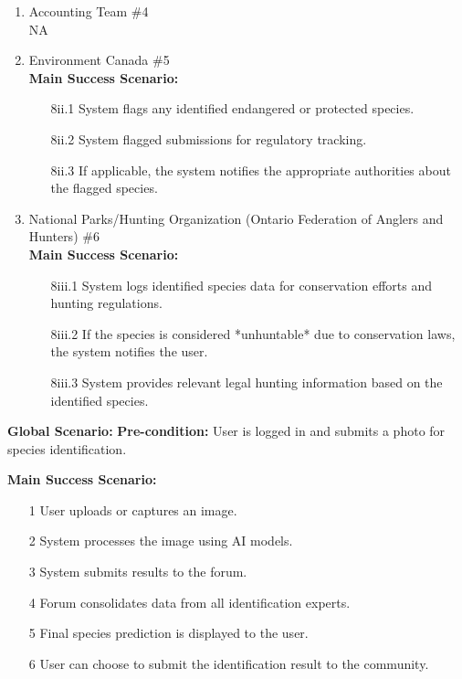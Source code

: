 \documentclass[]{article}
\begin{document}
\begin{enumerate}[{\bf BE1.}]
\begin{enumerate}[{\bf VP1.}]
    \item Accounting Team \#4 \\
        \newline NA

    \item Environment Canada \#5 \\
        \newline \textbf{Main Success Scenario:}
        \begin{enumerate}
            \item[8ii.1] System flags any identified endangered or protected species.
            \item[8ii.2] System flagged submissions for regulatory tracking.
            \item[8ii.3] If applicable, the system notifies the appropriate authorities about the flagged species.
        \end{enumerate}

    \item National Parks/Hunting Organization (Ontario Federation of Anglers and Hunters) \#6 \\
        \newline \textbf{Main Success Scenario:}
        \begin{enumerate}
            \item[8iii.1] System logs identified species data for conservation efforts and hunting regulations.
            \item[8iii.2] If the species is considered *unhuntable* due to conservation laws, the system notifies the user.
            \item[8iii.3] System provides relevant legal hunting information based on the identified species.
        \end{enumerate}
    \end{enumerate}
\textbf{Global Scenario:}
\noindent \textbf{Pre-condition:}  
    User is logged in and submits a photo for species identification.

\noindent \textbf{Main Success Scenario:}
\begin{enumerate}
    \item[1] User uploads or captures an image.
    \item[2] System processes the image using AI models.
    \item[3] System submits results to the forum.
    \item[4] Forum consolidates data from all identification experts.
    \item[5] Final species prediction is displayed to the user.
    \item[6] User can choose to submit the identification result to the community.
\end{enumerate}


\end{enumerate}
\end{document}
